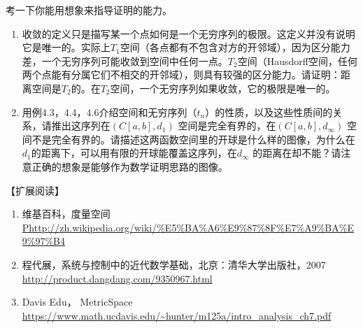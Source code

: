考一下你能用想象来指导证明的能力。

\begin{enumerate}
	\item 收敛的定义只是描写某一个点如何是一个无穷序列的极限。这定义并没有说明它是唯一的。实际上$ T_1 $空间（各点都有不包含对方的开邻域），因为区分能力差，一个无穷序列可能收敛到空间中任何一点。$T_2$空间（Hausdorff空间，任何两个点能有分属它们不相交的开邻域），则具有较强的区分能力。请证明：距离空间是$T_2$的。在$T_2$空间，一个无穷序列如果收敛，它的极限是唯一的。
	
	\item 用例4.3，4.4，4.6介绍空间和无穷序列（$ t_n $）的性质，以及这些性质间的关系，请推出这序列在$ (C[a,b], d_1) $ 空间是完全有界的，在$ (C[a,b], d_\infty) $ 空间不是完全有界的。请描述这两函数空间里的开球是什么样的图像，为什么在$ d_1 $的距离下，可以用有限的开球能覆盖这序列，在$  d_\infty $ 的距离在却不能？请注意正确的想象是能够作为数学证明思路的图像。
\end{enumerate}

【扩展阅读】

\begin{enumerate}
	\item 维基百科，度量空间\url{Phttp://zh.wikipedia.org/wiki/\%E5\%BA\%A6\%E9\%87\%8F\%E7\%A9\%BA\%E9\%97\%B4}
	
	\item 程代展，系统与控制中的近代数学基础，北京：清华大学出版社，2007 \url{http://product.dangdang.com/9350967.html}
	
	\item Davis Edu， MetricSpace  \url{https://www.math.ucdavis.edu/~hunter/m125a/intro_analysis_ch7.pdf}
\end{enumerate}